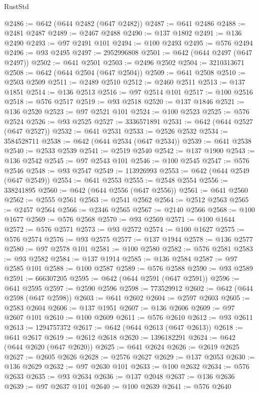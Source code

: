 \begin{lexlean}{RustStd}
\begin{coremodule}
@2486 := @642 (@644 @2482 (@647 @2482))
@2487 := @641 @2486
@2488 := @2481 @2487
@2489 := @2467 @2488
@2490 := @137 @1802
@2491 := @136 @2490
@2493 := @97 @2491 @101
@2494 := @100 @2493
@2495 := @576 @2494
@2496 := @93 @2495
@2497 := 2952996808
@2501 := @642 (@644 @2497 (@647 @2497))
@2502 := @641 @2501
@2503 := @2496 @2502
@2504 := 3210313671
@2508 := @642 (@644 @2504 (@647 @2504))
@2509 := @641 @2508
@2510 := @2503 @2509
@2511 := @2489 @2510
@2512 := @2460 @2511
@2513 := @137 @1851
@2514 := @136 @2513
@2516 := @97 @2514 @101
@2517 := @100 @2516
@2518 := @576 @2517
@2519 := @93 @2518
@2520 := @137 @1846
@2521 := @136 @2520
@2523 := @97 @2521 @101
@2524 := @100 @2523
@2525 := @576 @2524
@2526 := @93 @2525
@2527 := 3336571891
@2531 := @642 (@644 @2527 (@647 @2527))
@2532 := @641 @2531
@2533 := @2526 @2532
@2534 := 3584528711
@2538 := @642 (@644 @2534 (@647 @2534))
@2539 := @641 @2538
@2540 := @2533 @2539
@2541 := @2519 @2540
@2542 := @137 @1900
@2543 := @136 @2542
@2545 := @97 @2543 @101
@2546 := @100 @2545
@2547 := @576 @2546
@2548 := @93 @2547
@2549 := 113926993
@2553 := @642 (@644 @2549 (@647 @2549))
@2554 := @641 @2553
@2555 := @2548 @2554
@2556 := 338241895
@2560 := @642 (@644 @2556 (@647 @2556))
@2561 := @641 @2560
@2562 := @2555 @2561
@2563 := @2541 @2562
@2564 := @2512 @2563
@2565 := @2457 @2564
@2566 := @2346 @2565
@2567 := @2140 @2566
@2568 := @100 @1677
@2569 := @576 @2568
@2570 := @93 @2569
@2571 := @100 @1644
@2572 := @576 @2571
@2573 := @93 @2572
@2574 := @100 @1627
@2575 := @576 @2574
@2576 := @93 @2575
@2577 := @137 @1944
@2578 := @136 @2577
@2580 := @97 @2578 @101
@2581 := @100 @2580
@2582 := @576 @2581
@2583 := @93 @2582
@2584 := @137 @1914
@2585 := @136 @2584
@2587 := @97 @2585 @101
@2588 := @100 @2587
@2589 := @576 @2588
@2590 := @93 @2589
@2591 := 666307205
@2595 := @642 (@644 @2591 (@647 @2591))
@2596 := @641 @2595
@2597 := @2590 @2596
@2598 := 773529912
@2602 := @642 (@644 @2598 (@647 @2598))
@2603 := @641 @2602
@2604 := @2597 @2603
@2605 := @2583 @2604
@2606 := @137 @1951
@2607 := @136 @2606
@2609 := @97 @2607 @101
@2610 := @100 @2609
@2611 := @576 @2610
@2612 := @93 @2611
@2613 := 1294757372
@2617 := @642 (@644 @2613 (@647 @2613))
@2618 := @641 @2617
@2619 := @2612 @2618
@2620 := 1396182291
@2624 := @642 (@644 @2620 (@647 @2620))
@2625 := @641 @2624
@2626 := @2619 @2625
@2627 := @2605 @2626
@2628 := @2576 @2627
@2629 := @137 @2053
@2630 := @136 @2629
@2632 := @97 @2630 @101
@2633 := @100 @2632
@2634 := @576 @2633
@2635 := @93 @2634
@2636 := @137 @2048
@2637 := @136 @2636
@2639 := @97 @2637 @101
@2640 := @100 @2639
@2641 := @576 @2640

\end{coremodule}
\end{lexlean}
